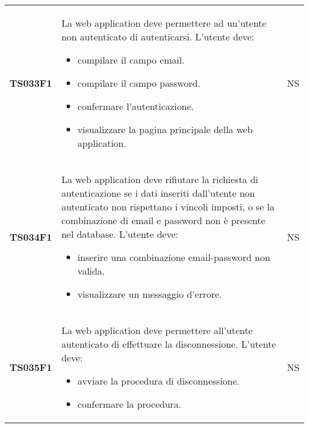 \documentclass[../piano-di-qualifica.tex]{subfiles}
\begin{document}
\begin{longtable}[H]{>{\centering\bfseries}m{3cm} >{}m{10cm} >{\centering\arraybackslash}m{3cm}}
  TS033F1            & La web application deve permettere ad un'utente non autenticato di autenticarsi. \newline
  L'utente deve:
  \begin{itemize}
    \item compilare il campo email.
    \item compilare il campo password.
    \item confermare l'autenticazione.
    \item visualizzare la pagina principale della web application.
  \end{itemize}
                     & NS                                                                                                                                                                                                                                                               \\
  TS034F1            & La web application deve rifiutare la richiesta di autenticazione se i dati inseriti dall'utente non autenticato non rispettano i vincoli imposti, o se la combinazione di email e password non è presente nel database. \newline
  L'utente deve:
  \begin{itemize}
    \item inserire una combinazione email-password non valida.
    \item visualizzare un messaggio d'errore.
  \end{itemize}
                     & NS                                                                                                                                                                                                                                                               \\
  TS035F1            & La web application deve permettere all'utente autenticato di effettuare la disconnessione. \newline
  L'utente deve:
  \begin{itemize}
    \item avviare la procedura di disconnessione.
    \item confermare la procedura.
  \end{itemize}
                     & NS                                                                                                                                                                                                                                                               \\

\end{longtable}
\end{document}
